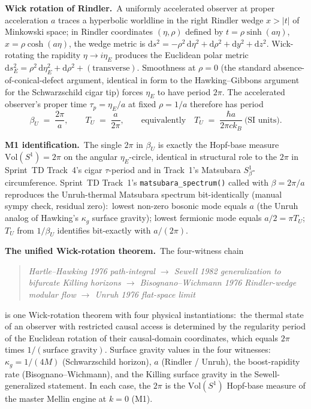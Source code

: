 \documentclass[11pt]{article}
\begin{document}
\textbf{Wick rotation of Rindler.}\ A uniformly accelerated observer
at proper acceleration $a$ traces a hyperbolic worldline in the right
Rindler wedge $x > |t|$ of Minkowski space; in Rindler coordinates
$(\eta, \rho)$ defined by $t = \rho \sinh(a\eta)$, $x = \rho
\cosh(a\eta)$, the wedge metric is
$\mathrm{d}s^2 = -\rho^2\, \mathrm{d}\eta^2 + \mathrm{d}\rho^2 +
\mathrm{d}y^2 + \mathrm{d}z^2$.  Wick-rotating the rapidity $\eta \to
i \eta_E$ produces the Euclidean polar metric
$\mathrm{d}s^2_E = \rho^2\, \mathrm{d}\eta_E^2 + \mathrm{d}\rho^2 +
(\text{transverse})$.  Smoothness at $\rho = 0$ (the standard
absence-of-conical-defect argument, identical in form to the
Hawking--Gibbons argument for the Schwarzschild cigar tip) forces
$\eta_E$ to have period $2\pi$.  The accelerated observer's proper
time $\tau_p = \eta_E / a$ at fixed $\rho = 1/a$ therefore has period
\[
  \beta_U \;=\; \frac{2\pi}{a},
  \qquad
  T_U \;=\; \frac{a}{2\pi},
  \qquad
  \text{equivalently}
  \quad
  T_U \;=\; \frac{\hbar a}{2\pi c k_B}\ \text{(SI units)}.
\]

\textbf{M1 identification.}\ The single $2\pi$ in $\beta_U$ is exactly
the Hopf-base measure $\mathrm{Vol}(S^1) = 2\pi$ on the angular
$\eta_E$-circle, identical in structural role to the $2\pi$ in
Sprint~TD Track~4's cigar $\tau$-period and in Track~1's Matsubara
$S^1_\beta$-circumference.  Sprint~TD Track~1's
\texttt{matsubara\_spectrum()} called with $\beta = 2\pi/a$ reproduces
the Unruh-thermal Matsubara spectrum bit-identically (manual sympy
check, residual zero):\ lowest non-zero bosonic mode equals $a$ (the
Unruh analog of Hawking's $\kappa_g$ surface gravity); lowest
fermionic mode equals $a/2 = \pi T_U$; $T_U$ from $1/\beta_U$
identifies bit-exactly with $a/(2\pi)$.

\textbf{The unified Wick-rotation theorem.}\ The four-witness chain
\begin{quote}\itshape
  Hartle--Hawking 1976 path-integral $\to$ Sewell 1982 generalization
  to bifurcate Killing horizons $\to$ Bisognano--Wichmann 1976
  Rindler-wedge modular flow $\to$ Unruh 1976 flat-space limit
\end{quote}
is one Wick-rotation theorem with four physical instantiations:\ the
thermal state of an observer with restricted causal access is
determined by the regularity period of the Euclidean rotation of
their causal-domain coordinates, which equals $2\pi$ times
$1/(\text{surface gravity})$.  Surface gravity values in the four
witnesses:\ $\kappa_g = 1/(4M)$ (Schwarzschild horizon), $a$
(Rindler / Unruh), the boost-rapidity rate (Bisognano--Wichmann), and
the Killing surface gravity in the Sewell-generalized statement.  In
each case, the $2\pi$ is the $\mathrm{Vol}(S^1)$ Hopf-base measure of
the master Mellin engine at $k = 0$ (M1).
\end{document}

